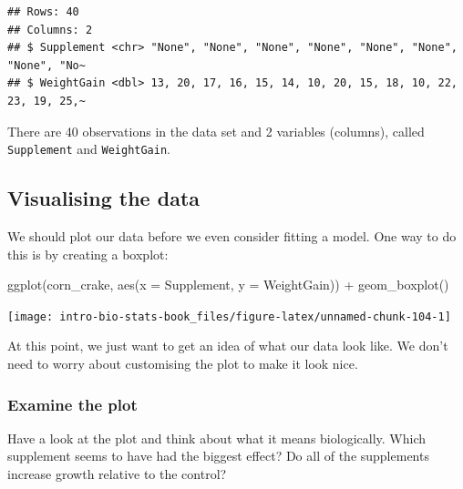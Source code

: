 \documentclass[
]{book}
\newenvironment{Shaded}{\begin{snugshade}}{\end{snugshade}}
\newcommand{\AttributeTok}[1]{\textcolor[rgb]{0.77,0.63,0.00}{#1}}
\newcommand{\FunctionTok}[1]{\textcolor[rgb]{0.00,0.00,0.00}{#1}}
\newcommand{\NormalTok}[1]{#1}
\newcommand{\SpecialCharTok}[1]{\textcolor[rgb]{0.00,0.00,0.00}{#1}}
\newenvironment{greybox}{
  \definecolor{shadecolor}{rgb}{0.95,0.95,0.95}  %
  \color{black}
  \begin{shaded}}
 {\end{shaded}}
\newenvironment{infobox}[1]
  {
  \begin{itemize}
  \renewcommand{\labelitemi}{
    \raisebox{-.7\height}[0pt][0pt]{
      {\setkeys{Gin}{width=3em,keepaspectratio}
        \texttt{[image: images/\#1]}}
    }
  }
  \setlength{\fboxsep}{1em}
  \begin{greybox}
  \item
  }
  {
  \end{greybox}
  \end{itemize}
  }
\begin{document}
\begin{verbatim}
## Rows: 40
## Columns: 2
## $ Supplement <chr> "None", "None", "None", "None", "None", "None", "None", "No~
## $ WeightGain <dbl> 13, 20, 17, 16, 15, 14, 10, 20, 15, 18, 10, 22, 23, 19, 25,~
\end{verbatim}

There are 40 observations in the data set and 2 variables (columns), called \texttt{Supplement} and \texttt{WeightGain}.

\hypertarget{visualising-the-data-1}{%
\subsection{Visualising the data}\label{visualising-the-data-1}}

We should plot our data before we even consider fitting a model. One way to do this is by creating a boxplot:

\begin{Shaded}
\begin{Highlighting}[]
\FunctionTok{ggplot}\NormalTok{(corn\_crake, }\FunctionTok{aes}\NormalTok{(}\AttributeTok{x =}\NormalTok{ Supplement, }\AttributeTok{y =}\NormalTok{ WeightGain)) }\SpecialCharTok{+} 
  \FunctionTok{geom\_boxplot}\NormalTok{()}
\end{Highlighting}
\end{Shaded}

\begin{center}\texttt{[image: intro-bio-stats-book\_files/figure-latex/unnamed-chunk-104-1]} \end{center}

At this point, we just want to get an idea of what our data look like. We don't need to worry about customising the plot to make it look nice.

\begin{infobox}{action}

\hypertarget{examine-the-plot}{%
\subsubsection*{Examine the plot}\label{examine-the-plot}}

Have a look at the plot and think about what it means biologically. Which supplement seems to have had the biggest effect? Do all of the supplements increase growth relative to the control?

\end{infobox}
\end{document}
